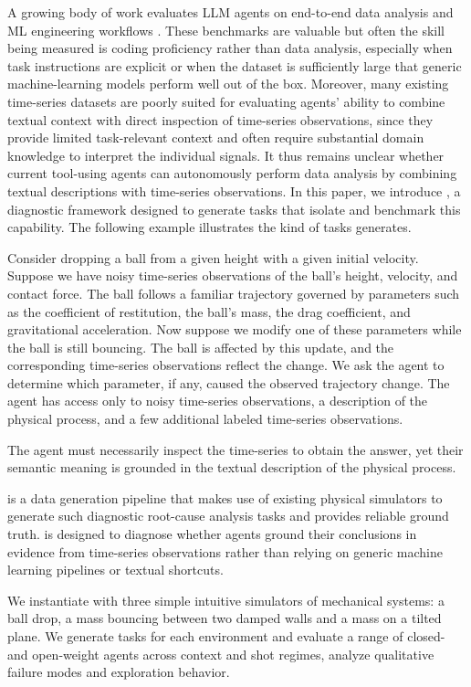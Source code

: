 A growing body of work evaluates LLM agents on end-to-end data analysis and ML engineering workflows \citep{hu2024infidabench,sahu2024insightbench,jing2024dsbench,wu2024daco,chan2024mle}.
These benchmarks are valuable but often the skill being measured is coding proficiency rather than data analysis, especially when task instructions are explicit or when the dataset is sufficiently large that generic machine-learning models perform well out of the box.
Moreover, many existing time-series datasets are poorly suited for evaluating agents' ability to combine textual context with direct inspection of time-series observations, since they provide limited task-relevant context and often require substantial domain knowledge to interpret the individual signals.
It thus remains unclear whether current tool-using agents can autonomously perform data analysis by combining textual descriptions with time-series observations.
In this paper, we introduce \name{}, a diagnostic framework designed to generate tasks that isolate and benchmark this capability. 
The following example illustrates the kind of tasks \name{} generates.

Consider dropping a ball from a given height with a given initial velocity.
Suppose we have noisy time-series observations of the ball's height, velocity, and contact force.
The ball follows a familiar trajectory governed by parameters such as the coefficient of restitution, the ball's mass, the drag coefficient, and gravitational acceleration.
Now suppose we modify one of these parameters while the ball is still bouncing.
The ball is affected by this update, and the corresponding time-series observations reflect the change.
We ask the agent to determine which parameter, if any, caused the observed trajectory change.
The agent has access only to noisy time-series observations, a description of the physical process, and a few additional labeled time-series observations.

The agent must necessarily inspect the time-series to obtain the answer, yet their semantic meaning is grounded in the textual description of the physical process. 

\name{} is a data generation pipeline that makes use of existing physical simulators to generate such diagnostic root-cause analysis tasks and provides reliable ground truth.
\name{} is designed to diagnose whether agents ground their conclusions in evidence from time-series observations rather than relying on generic machine learning pipelines or textual shortcuts.

We instantiate \name{} with three simple intuitive simulators of mechanical systems: a ball drop, a mass bouncing between two damped walls and a mass on a tilted plane.
We generate tasks for each environment and evaluate a range of closed- and open-weight agents across context and shot regimes, analyze qualitative failure modes and exploration behavior.
